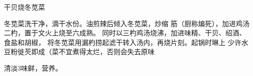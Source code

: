 \begin{recipe}{干贝烧冬苋菜}

\ingredients


\cooking

冬苋菜洗干净，滴干水份。油煎辣后倾入冬苋菜，炒缩 筋（厨称煸死），加进鸡汤二杓，置于文火上烧至六成熟。 同时以三杓鸡汤烧沸，加进味精、干贝、绍酒、食盐和胡椒， 将冬苋菜用漏杓捞起滤干转入汤内，再烧片刻。起锅时琳上 少许水豆粉徙芡即成（菜不宜煮得太烂，否则会失去原味

\notes

清淡3味鲜，营养。

\end{recipe}


